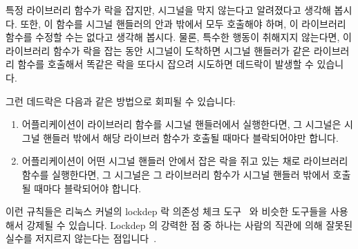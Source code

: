 특정 라이브러리 함수가 락을 잡지만, 시그널을 막지 않는다고 알려졌다고 생각해
봅시다.
또한, 이 함수를 시그널 핸들러의 안과 밖에서 모두 호출해야 하며, 이 라이브러리
함수를 수정할 수는 없다고 생각해 봅시다.
물론, 특수한 행동이 취해지지 않는다면, 이 라이브러리 함수가 락을 잡는 동안
시그널이 도착하면 시그널 핸들러가 같은 라이브러리 함수를 호출해서 똑같은 락을
또다시 잡으려 시도하면 데드락이 발생할 수 있습니다.

그런 데드락은 다음과 같은 방법으로 회피될 수 있습니다:

\begin{enumerate}
\item	어플리케이션이 라이브러리 함수를 시그널 핸들러에서 실행한다면, 그
	시그널은 시그널 핸들러 밖에서 해당 라이브러 함수가 호출될 때마다
	블락되어야만 합니다.
\item	어플리케이션이 어떤 시그널 핸들러 안에서 잡은 락을 쥐고 있는 채로
	라이브러리 함수를 실행한다면, 그 시그널은 그 라이브러리 함수가 시그널
	핸들러 밖에서 호출될 때마다 블락되어야 합니다.

\end{enumerate}

이런 규칙들은 리눅스 커널의 lockdep 락 의존성 체크
도구~\cite{JonathanCorbet2006lockdep} 와 비슷한 도구들을 사용해서 강제될 수
있습니다.
Lockdep 의 강력한 점 중 하나는 사람의 직관에 의해 잘못된 실수를 저지르지
않는다는 점입니다~\cite{StevenRostedt2011locdepCryptic}.
\iffalse

